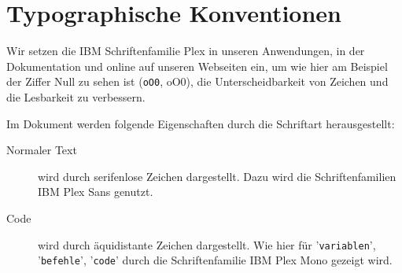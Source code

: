 \section{Typographische Konventionen
}\label{sec:global-typo}

Wir setzen die IBM Schriftenfamilie Plex  in unseren Anwendungen, in der Dokumentation und online auf unseren Webseiten ein, um wie hier am Beispiel der Ziffer Null zu sehen ist (\texttt{oO0}, oO0), die Unterscheidbarkeit von Zeichen und die Lesbarkeit zu verbessern.

Im Dokument werden folgende Eigenschaften durch die Schriftart herausgestellt:

\begin{description}
  \item[Normaler Text] wird durch serifenlose Zeichen dargestellt. Dazu wird die Schriftenfamilien IBM Plex Sans  genutzt.
  \item[Code] wird durch äquidistante Zeichen dargestellt. Wie hier  für '\verb|variablen|', '\verb|befehle|', '\verb|code|' durch die Schriftenfamilie IBM Plex Mono  gezeigt wird.
\end{description}

